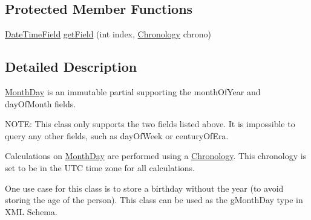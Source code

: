 \subsection*{Protected Member Functions}
\begin{DoxyCompactItemize}
\item 
\hyperlink{classorg_1_1joda_1_1time_1_1_date_time_field}{Date\-Time\-Field} \hyperlink{classorg_1_1joda_1_1time_1_1_month_day_afe4bf7233520313e44aded7b10fa9f6f}{get\-Field} (int index, \hyperlink{classorg_1_1joda_1_1time_1_1_chronology}{Chronology} chrono)
\end{DoxyCompactItemize}


\subsection{Detailed Description}
\hyperlink{classorg_1_1joda_1_1time_1_1_month_day}{Month\-Day} is an immutable partial supporting the month\-Of\-Year and day\-Of\-Month fields. 

N\-O\-T\-E\-: This class only supports the two fields listed above. It is impossible to query any other fields, such as day\-Of\-Week or century\-Of\-Era. 

Calculations on \hyperlink{classorg_1_1joda_1_1time_1_1_month_day}{Month\-Day} are performed using a \hyperlink{classorg_1_1joda_1_1time_1_1_chronology}{Chronology}. This chronology is set to be in the U\-T\-C time zone for all calculations. 

One use case for this class is to store a birthday without the year (to avoid storing the age of the person). This class can be used as the g\-Month\-Day type in X\-M\-L Schema. 


